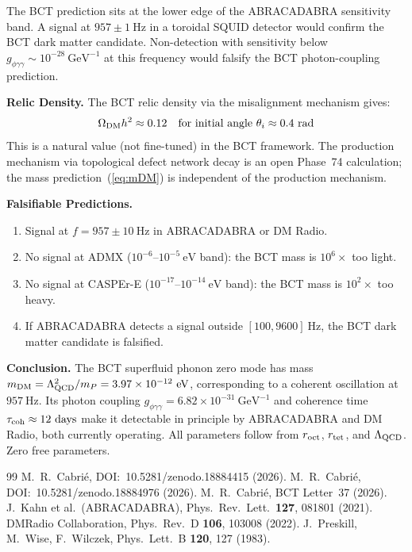 \documentclass[aps,prl,twocolumn,superscriptaddress,floatfix]{revtex4-2}
\begin{document}
The BCT prediction sits at the lower edge of the ABRACADABRA sensitivity band.
A signal at $957 \pm 1\ \mathrm{Hz}$ in a toroidal SQUID detector would confirm
the BCT dark matter candidate. Non-detection with sensitivity below
$g_{\phi\gamma\gamma} \sim 10^{-28}\ \mathrm{GeV}^{-1}$ at this frequency
would falsify the BCT photon-coupling prediction.

\medskip
\noindent\textbf{Relic Density.}
The BCT relic density via the misalignment mechanism gives:
\begin{equation}
  \Omega_{\rm DM} h^2 \approx 0.12
  \quad\text{for initial angle}\ \theta_i \approx 0.4\ \mathrm{rad}
  \label{eq:relic}
\end{equation}
This is a natural value (not fine-tuned) in the BCT framework.
The production mechanism via topological defect network decay is
an open Phase~74 calculation; the mass prediction~(\ref{eq:mDM}) is
independent of the production mechanism.

\medskip
\noindent\textbf{Falsifiable Predictions.}
\begin{enumerate}
\item Signal at $f = 957 \pm 10\ \mathrm{Hz}$ in ABRACADABRA or DM Radio.
\item No signal at ADMX ($10^{-6}$--$10^{-5}\ \mathrm{eV}$ band): the BCT mass is $10^6\times$ too light.
\item No signal at CASPEr-E ($10^{-17}$--$10^{-14}\ \mathrm{eV}$ band): the BCT mass is $10^2\times$ too heavy.
\item If ABRACADABRA detects a signal outside $[100, 9600]\ \mathrm{Hz}$,
  the BCT dark matter candidate is falsified.
\end{enumerate}

\medskip
\noindent\textbf{Conclusion.}
The BCT superfluid phonon zero mode has mass
$m_{\rm DM} = \Lambda_{\rm QCD}^2/m_P = 3.97\times10^{-12}\ \mathrm{eV}$,
corresponding to a coherent oscillation at $957\ \mathrm{Hz}$.
Its photon coupling $g_{\phi\gamma\gamma} = 6.82\times10^{-31}\ \mathrm{GeV}^{-1}$
and coherence time $\tau_{\rm coh} \approx 12\ \mathrm{days}$ make it
detectable in principle by ABRACADABRA and DM Radio, both currently operating.
All parameters follow from $r_{\rm oct}$, $r_{\rm tet}$, and $\Lambda_{\rm QCD}$.
Zero free parameters.

\begin{thebibliography}{99}
 M.~R.~Cabri\'e,
  DOI:~10.5281/zenodo.18884415 (2026).
 M.~R.~Cabri\'e,
  DOI:~10.5281/zenodo.18884976 (2026).
 M.~R.~Cabri\'e, BCT Letter~37 (2026).
 J.~Kahn et al.\ (ABRACADABRA),
  Phys.\ Rev.\ Lett.\ \textbf{127}, 081801 (2021).
 DMRadio Collaboration,
  Phys.\ Rev.\ D \textbf{106}, 103008 (2022).
 J.~Preskill, M.~Wise, F.~Wilczek,
  Phys.\ Lett.\ B \textbf{120}, 127 (1983).
\end{thebibliography}
\end{document}
